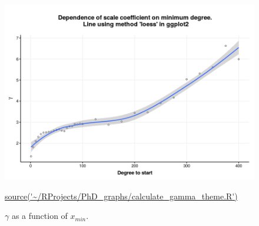 \begin{figure}
    \centering
    \includegraphics[width=\textwidth]{images/chapter3/poweRlaw/Rplot_gamma_theme.png}
    \caption[$\gamma$ as function of $x_{min}$]{$\gamma$ as a function of $x_{min}$. }
    \tiny\url{source('~/RProjects/PhD_graphs/calculate_gamma_theme.R')}
    \label{fig:gamma_main}
\end{figure}





